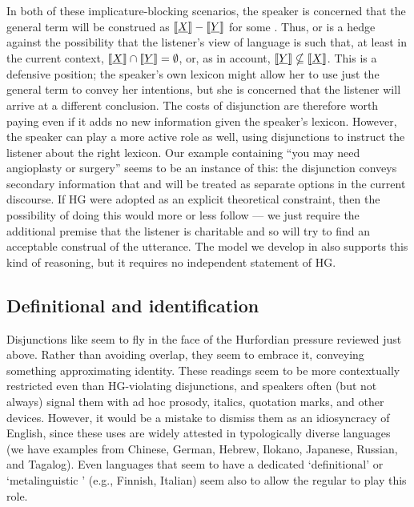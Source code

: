 \documentclass{article}
\begin{document}
In both of these implicature-blocking scenarios, the speaker is
concerned that the general term  will be construed as
$\llbracket\emph{X}\rrbracket-\llbracket\emph{Y}\rrbracket$ for some . Thus,  or
 is a hedge against the possibility that the listener's view
of language is such that, at least in the current context,
$\llbracket\emph{X}\rrbracket \cap \llbracket\emph{Y}\rrbracket = \emptyset$, or, as in
 account,
$\llbracket\emph{Y}\rrbracket \nsubseteq \llbracket\emph{X}\rrbracket$. This is a defensive
position; the speaker's own lexicon might allow her to use just the
general term to convey her intentions, but she is concerned that the
listener will arrive at a different conclusion. The costs of
disjunction are therefore worth paying even if it adds no new
information given the speaker's lexicon.  However, the speaker can
play a more active role as well, using disjunctions to instruct the
listener about the right lexicon. Our 
example containing ``you may need angioplasty or surgery'' seems to be
an instance of this: the disjunction conveys secondary information
that  and  will be treated as separate
options in the current discourse. If HG were adopted as an explicit
theoretical constraint, then the possibility of doing this would more
or less follow --- we just require the additional premise that the
listener is charitable and so will try to find an acceptable construal
of the utterance. The model we develop in  also
supports this kind of reasoning, but it requires no independent
statement of HG.
 

\subsection{Definitional and identification}\label{sec:data:definitional}


Disjunctions like  seem to fly in the
face of the Hurfordian pressure reviewed just above. Rather than
avoiding overlap, they seem to embrace it, conveying something
approximating identity. These readings seem to be more contextually
restricted even than HG-violating disjunctions, and speakers often
(but not always) signal them with ad hoc prosody, italics, quotation
marks, and other devices. However, it would be a mistake to dismiss
them as an idiosyncracy of English, since these uses are widely
attested in typologically diverse languages (we have examples from
Chinese, German, Hebrew, Ilokano, Japanese, Russian, and
Tagalog). Even languages that seem to have a dedicated `definitional'
or `metalinguistic ' (e.g., Finnish, Italian) seem also to
allow the regular  to play this role.
\end{document}
